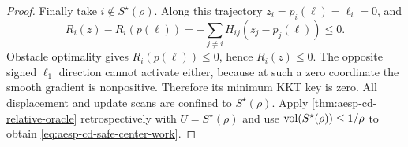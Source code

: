 \begin{proof}
Finally take $i\notin S^\star(\rho)$.  Along this trajectory
$z_i=p_i(\ell)=\ell_i=0$, and
\begin{equation*}
 R_i(z)-R_i(p(\ell))
 =-\sum_{j\neq i}H_{ij}(z_j-p_j(\ell))\leq0.
\end{equation*}
Obstacle optimality gives $R_i(p(\ell))\leq0$, hence $R_i(z)\leq0$.
The opposite signed $\ell_1$ direction cannot activate either, because at
such a zero coordinate the smooth gradient is nonpositive.  Therefore its
minimum KKT key is zero.  All displacement and update scans are confined to
$S^\star(\rho)$.  Apply \cref{thm:aesp-cd-relative-oracle} retrospectively
with $U=S^\star(\rho)$ and use
$\operatorname{vol}(S^\star(\rho))\leq1/\rho$ to obtain
\cref{eq:aesp-cd-safe-center-work}.
\end{proof}

